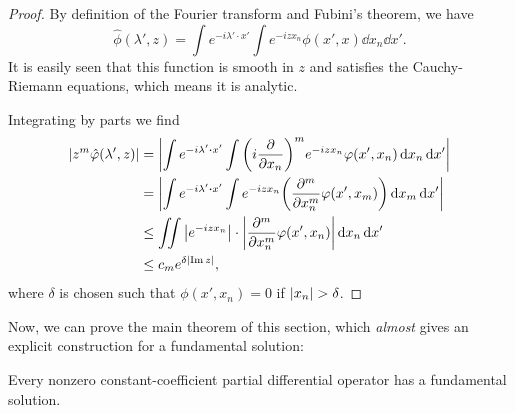 \begin{proof}
	By definition of the Fourier transform and Fubini's theorem, we have
	\[
	\hat\phi(\lambda', z) = \int e^{-i\lambda' \cdot x'} \int e^{-i z x_n} \phi(x', x) \dd{x_n} \dd{x'}. 
	\]
	It is easily seen that this function is smooth in $z$ and satisfies the Cauchy-Riemann equations, which means it is analytic. 
	
	Integrating by parts we find
	\begin{align*}
		\abs{z^m \hat\phi(\lambda', z)} &= \abs{\int e^{-i\lambda' \vdot x'} \int \qty(i \pdv{x_n})^m e^{-i z x_n} \phi(x', x_n) \dd{x_n} \dd{x'} } \\
		&= \abs{\int e^{-i\lambda' \vdot x'} \int e^{-i z x_n} \qty(\pdv[m]{x_n} \phi(x', x_m)) \dd{x_m} \dd{x'}} \\
		&\leq \iint \abs{e^{-iz x_n}} \cdot \abs{\pdv[m]{x_n} \phi(x', x_n)} \dd{x_n} \dd{x'} \\
	&\leq c_m e^{\delta \abs{\Im z}}, 
	\end{align*}
	where $\delta$ is chosen such that $\phi(x', x_n) = 0$ if $\abs{x_n}> \delta$. 
\end{proof}

Now, we can prove the main theorem of this section, which \emph{almost} gives an explicit construction for a fundamental solution:
\begin{theorem}
	Every nonzero constant-coefficient partial differential operator has a fundamental solution. 
\end{theorem}

